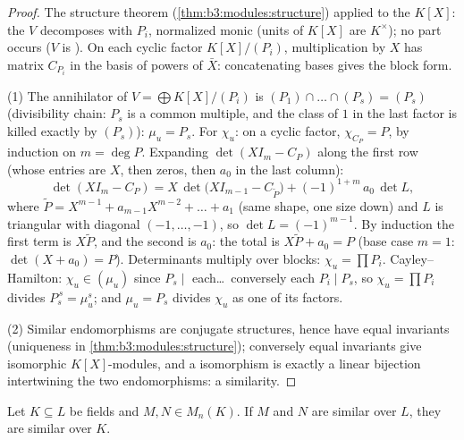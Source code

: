 \begin{proof}
The structure theorem (\cref{thm:b3:modules:structure}) applied
to the  $K[X]$: the  $V$ decomposes with
 $P_i$, normalized monic (units of $K[X]$ are
$K^\times$); no  part occurs ($V$ is ). On each cyclic
factor $K[X]/(P_i)$, multiplication by $X$ has matrix $C_{P_i}$
in the basis of powers of $\bar X$: concatenating bases gives the
block form.

(1) The annihilator of $V = \bigoplus K[X]/(P_i)$ is $(P_1)\cap
\dots\cap(P_s) = (P_s)$ (divisibility chain: $P_s$ is a common
multiple, and the class of $1$ in the last factor is killed
exactly by $(P_s)$): $\mu_u = P_s$. For $\chi_u$: on a cyclic
factor, $\chi_{C_P} = P$, by induction on $m = \deg P$. Expanding
$\det(XI_m - C_P)$ along the first row (whose entries are $X$, then
zeros, then $a_0$ in the last column):
\[
\det(XI_m - C_P) = X\,\det\bigl(XI_{m-1} - C_{\tilde P}\bigr)
+ (-1)^{1+m}\,a_0\,\det L ,
\]
where $\tilde P = X^{m-1} + a_{m-1}X^{m-2} + \dots + a_1$ (same
shape, one size down) and $L$ is triangular with diagonal
$(-1, \dots, -1)$, so $\det L = (-1)^{m-1}$. By induction the
first term is $X\tilde P$, and the second is $a_0$: the total is
$X\tilde P + a_0 = P$ (base case $m=1$: $\det(X + a_0) = P$).
Determinants multiply over blocks:
$\chi_u = \prod P_i$. Cayley--Hamilton: $\chi_u \in (\mu_u)$
since $P_s \mid$ each\dots\ conversely each $P_i \mid P_s$, so
$\chi_u = \prod P_i$ divides $P_s^{\,s} = \mu_u^s$; and $\mu_u =
P_s$ divides $\chi_u$ as one of its factors.

(2) Similar endomorphisms are conjugate  structures, hence
have equal invariants (uniqueness in
\cref{thm:b3:modules:structure}); conversely equal invariants
give isomorphic $K[X]$-modules, and a  isomorphism is
exactly a linear bijection intertwining the two endomorphisms: a
similarity.
\end{proof}

\begin{corollary}
\label{cor:b3:modules:descent}
Let $K \subseteq L$ be fields and $M, N \in M_n(K)$. If $M$ and
$N$ are similar over $L$, they are similar over $K$.
\end{corollary}


